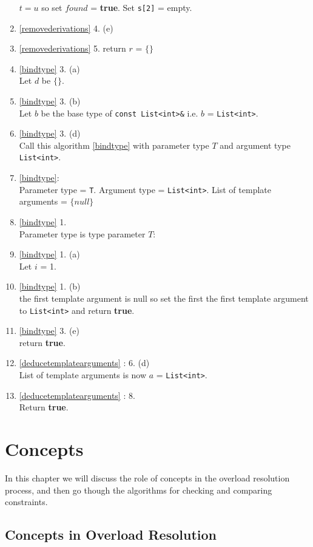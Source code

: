 \documentclass[a4paper,oneside,11pt]{book}
\theoremstyle{definition}
\begin{document}
\begin{enumerate}
$t = u$ so set $found$ = \textbf{true}. Set \verb|s[2]| = empty.
\item
\ref{removederivations} 4. (e)\\
\item
\ref{removederivations} 5. return $r$ = $\{\}$
\item
\ref{bindtype} 3. (a)\\
Let $d$ be $\{\}$.
\item
\ref{bindtype} 3. (b)\\
Let $b$ be the base type of \verb|const List<int>&| i.e. $b$ = \verb|List<int>|.
\item
\ref{bindtype} 3. (d)\\
Call this algorithm \ref{bindtype} with parameter type $T$ and argument type \verb|List<int>|.
\item
\ref{bindtype}:\\
Parameter type = \verb|T|.
Argument type = \verb|List<int>|.
List of template arguments = $\{null\}$
\item
\ref{bindtype} 1.\\
Parameter type is type parameter $T$:
\item
\ref{bindtype} 1. (a)\\
Let $i$ = 1.
\item
\ref{bindtype} 1. (b)\\
the first template argument is null so set  the first the first template argument to \verb|List<int>| and return \textbf{true}.
\item
\ref{bindtype} 3. (e)\\
return \textbf{true}.
\item
\ref{deducetemplatearguments} : 6. (d)\\
List of template arguments is now $a$ = \verb|List<int>|.
\item
\ref{deducetemplatearguments} : 8.\\
Return \textbf{true}.
\end{enumerate}

\chapter{Concepts}

In this chapter we will discuss the role of concepts in the overload resolution process,
and then go though the algorithms for checking and comparing constraints.

\section{Concepts in Overload Resolution}
\end{document}
